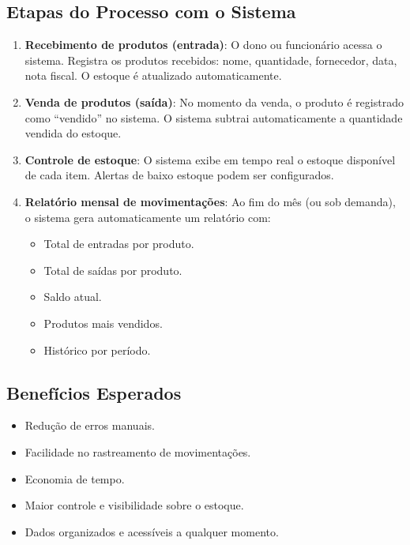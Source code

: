 \documentclass[
	12pt,				%
	openany,			%
	twoside,			%
	a4paper,			%
	english,			%
	brazil				%
	]{abntex2}
\begin{document}
\subsection*{Etapas do Processo com o Sistema}

\begin{enumerate}
    \item \textbf{Recebimento de produtos (entrada)}: O dono ou funcionário acessa o sistema. Registra os produtos recebidos: nome, quantidade, fornecedor, data, nota fiscal. O estoque é atualizado automaticamente.

    \item \textbf{Venda de produtos (saída)}: No momento da venda, o produto é registrado como “vendido” no sistema. O sistema subtrai automaticamente a quantidade vendida do estoque.

    \item \textbf{Controle de estoque}: O sistema exibe em tempo real o estoque disponível de cada item. Alertas de baixo estoque podem ser configurados.

    \item \textbf{Relatório mensal de movimentações}: Ao fim do mês (ou sob demanda), o sistema gera automaticamente um relatório com:
    \begin{itemize}
        \item Total de entradas por produto.
        \item Total de saídas por produto.
        \item Saldo atual.
        \item Produtos mais vendidos.
        \item Histórico por período.
    \end{itemize}
\end{enumerate}

\subsection*{Benefícios Esperados}

\begin{itemize}
    \item Redução de erros manuais.
    \item Facilidade no rastreamento de movimentações.
    \item Economia de tempo.
    \item Maior controle e visibilidade sobre o estoque.
    \item Dados organizados e acessíveis a qualquer momento.
\end{itemize}
\end{document}
